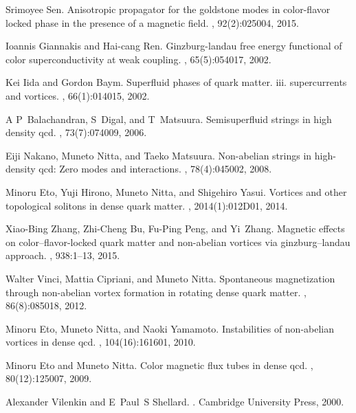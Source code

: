 \documentclass[12pt]{article}
\begin{document}
\begin{thebibliography}{99}
Srimoyee Sen.
\newblock Anisotropic propagator for the goldstone modes in color-flavor locked
  phase in the presence of a magnetic field.
, 92(2):025004, 2015.

Ioannis Giannakis and Hai-cang Ren.
\newblock Ginzburg-landau free energy functional of color superconductivity at
  weak coupling.
, 65(5):054017, 2002.

Kei Iida and Gordon Baym.
\newblock Superfluid phases of quark matter. iii. supercurrents and vortices.
, 66(1):014015, 2002.

A P~Balachandran, S~Digal, and T~Matsuura.
\newblock Semisuperfluid strings in high density qcd.
, 73(7):074009, 2006.

Eiji Nakano, Muneto Nitta, and Taeko Matsuura.
\newblock Non-abelian strings in high-density qcd: Zero modes and interactions.
, 78(4):045002, 2008.

Minoru Eto, Yuji Hirono, Muneto Nitta, and Shigehiro Yasui.
\newblock Vortices and other topological solitons in dense quark matter.
,
  2014(1):012D01, 2014.

Xiao-Bing Zhang, Zhi-Cheng Bu, Fu-Ping Peng, and Yi~Zhang.
\newblock Magnetic effects on color--flavor-locked quark matter and non-abelian
  vortices via ginzburg--landau approach.
, 938:1--13, 2015.

Walter Vinci, Mattia Cipriani, and Muneto Nitta.
\newblock Spontaneous magnetization through non-abelian vortex formation in
  rotating dense quark matter.
, 86(8):085018, 2012.

Minoru Eto, Muneto Nitta, and Naoki Yamamoto.
\newblock Instabilities of non-abelian vortices in dense qcd.
, 104(16):161601, 2010.

Minoru Eto and Muneto Nitta.
\newblock Color magnetic flux tubes in dense qcd.
, 80(12):125007, 2009.

Alexander Vilenkin and E~Paul~S Shellard.
.
\newblock Cambridge University Press, 2000.


\end{thebibliography}
\end{document}
